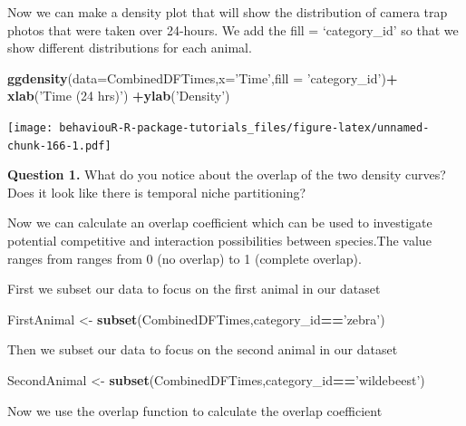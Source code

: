 \documentclass[]{book}
\newenvironment{Shaded}{\begin{snugshade}}{\end{snugshade}}
\newcommand{\DataTypeTok}[1]{\textcolor[rgb]{0.13,0.29,0.53}{#1}}
\newcommand{\KeywordTok}[1]{\textcolor[rgb]{0.13,0.29,0.53}{\textbf{#1}}}
\newcommand{\NormalTok}[1]{#1}
\newcommand{\OperatorTok}[1]{\textcolor[rgb]{0.81,0.36,0.00}{\textbf{#1}}}
\newcommand{\StringTok}[1]{\textcolor[rgb]{0.31,0.60,0.02}{#1}}
\begin{document}
Now we can make a density plot that will show the distribution of camera trap photos that were taken over 24-hours. We add the fill = `category\_id' so that we show different distributions for each animal.

\begin{Shaded}
\begin{Highlighting}[]
\KeywordTok{ggdensity}\NormalTok{(}\DataTypeTok{data=}\NormalTok{CombinedDFTimes,}\DataTypeTok{x=}\StringTok{'Time'}\NormalTok{,}\DataTypeTok{fill =} \StringTok{'category_id'}\NormalTok{)}\OperatorTok{+}
\StringTok{  }\KeywordTok{xlab}\NormalTok{(}\StringTok{'Time (24 hrs)'}\NormalTok{) }\OperatorTok{+}\KeywordTok{ylab}\NormalTok{(}\StringTok{'Density'}\NormalTok{)}
\end{Highlighting}
\end{Shaded}

\texttt{[image: behaviouR-R-package-tutorials\_files/figure-latex/unnamed-chunk-166-1.pdf]}

\textbf{Question 1.} What do you notice about the overlap of the two density curves? Does it look like there is temporal niche partitioning?

Now we can calculate an overlap coefficient which can be used to investigate potential competitive and interaction possibilities between species.The value ranges from ranges from 0 (no overlap) to 1 (complete overlap).

First we subset our data to focus on the first animal in our dataset

\begin{Shaded}
\begin{Highlighting}[]
\NormalTok{FirstAnimal <-}\StringTok{ }\KeywordTok{subset}\NormalTok{(CombinedDFTimes,category_id}\OperatorTok{==}\StringTok{'zebra'}\NormalTok{)}
\end{Highlighting}
\end{Shaded}

Then we subset our data to focus on the second animal in our dataset

\begin{Shaded}
\begin{Highlighting}[]
\NormalTok{SecondAnimal <-}\StringTok{ }\KeywordTok{subset}\NormalTok{(CombinedDFTimes,category_id}\OperatorTok{==}\StringTok{'wildebeest'}\NormalTok{)}
\end{Highlighting}
\end{Shaded}

Now we use the overlap function to calculate the overlap coefficient
\end{document}
